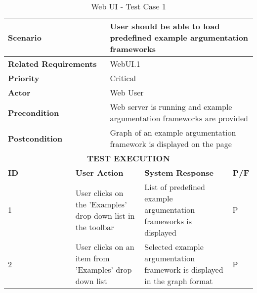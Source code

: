 \renewcommand{\arraystretch}{1.5}
\begin{longtable}[c]{p{}|p{}|p{}|p{}|p{}}
	\caption{Web UI - Test Case 1}
	\label{table:testcase1}
	\\
	\hline
	\multicolumn{2}{p{0.3\textwidth}}{\textbf{Scenario}} & \multicolumn{3}{p{0.7\textwidth}}{User should be able to load predefined example argumentation frameworks} \\ 
	\hline
	\endfirsthead
	\endhead
	\multicolumn{2}{p{0.4\textwidth}}{\textbf{Related Requirements}} & \multicolumn{3}{p{0.6\textwidth}}{WebUI.1} \\ 
	\hline
	\multicolumn{2}{p{0.4\textwidth}}{\textbf{Priority}} & \multicolumn{3}{p{0.6\textwidth}}{Critical} \\ 
	\hline
	\multicolumn{2}{p{0.3\textwidth}}{\textbf{Actor}} & \multicolumn{3}{p{0.7\textwidth}}{Web User} \\ 
	\hline
	\multicolumn{2}{p{0.3\textwidth}}{\textbf{Precondition}} & \multicolumn{3}{p{0.7\textwidth}}{Web server is running and example argumentation frameworks are provided} \\ 
	\hline
	\multicolumn{2}{p{0.3\textwidth}}{\textbf{Postcondition}} & \multicolumn{3}{p{0.7\textwidth}}{Graph of an example argumentation framework is displayed on the page} \\ 
	\hline
	\multicolumn{5}{c}{\cellcolor{grey}\textbf{TEST EXECUTION}} \\ 
	\hline
	\textbf{ID} & \multicolumn{2}{|p{0.4\textwidth}|}{\textbf{User Action}} & \textbf{System Response} & \textbf{P/F} \\ 
	\hline
	1 & \multicolumn{2}{|p{0.4\textwidth}|}{User clicks on the 'Examples' drop down list in the toolbar} & List of predefined example argumentation frameworks is displayed & P \\ 
	\hline
	2 & \multicolumn{2}{|p{0.4\textwidth}|}{User clicks on an item from 'Examples' drop down list} & Selected example argumentation framework is displayed in the graph format & P \\ \hline 
\end{longtable}


